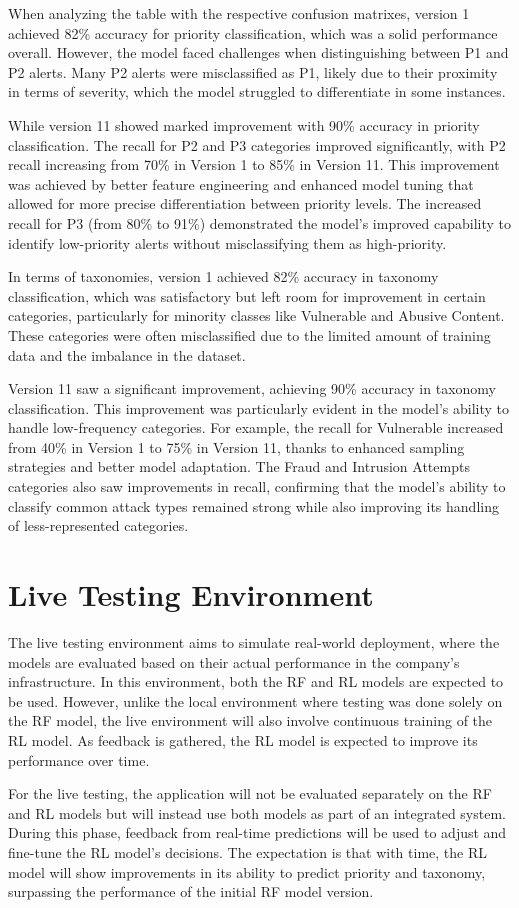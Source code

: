 When analyzing the table with the respective confusion matrixes, version 1 achieved 82\% accuracy for priority classification, which was a solid performance overall. 
However, the model faced challenges when distinguishing between P1 and P2 alerts. 
Many P2 alerts were misclassified as P1, likely due to their proximity in terms of severity, which the model struggled to differentiate in some instances.

While version 11 showed marked improvement with 90\% accuracy in priority classification. 
The recall for P2 and P3 categories improved significantly, with P2 recall increasing from 70\% in Version 1 to 85\% in Version 11. 
This improvement was achieved by better feature engineering and enhanced model tuning that allowed for more precise differentiation between priority levels. 
The increased recall for P3 (from 80\% to 91\%) demonstrated the model's improved capability to identify low-priority alerts without misclassifying them as high-priority.

In terms of taxonomies, version 1 achieved 82\% accuracy in taxonomy classification, which was satisfactory but left room for improvement in certain categories, particularly for minority classes like Vulnerable and Abusive Content. 
These categories were often misclassified due to the limited amount of training data and the imbalance in the dataset.

Version 11 saw a significant improvement, achieving 90\% accuracy in taxonomy classification. 
This improvement was particularly evident in the model's ability to handle low-frequency categories. For example, the recall for Vulnerable increased from 40\% in Version 1 to 75\% in Version 11, thanks to enhanced sampling strategies and better model adaptation. 
The Fraud and Intrusion Attempts categories also saw improvements in recall, confirming that the model's ability to classify common attack types remained strong while also improving its handling of less-represented categories.

\section{Live Testing Environment}

The live testing environment aims to simulate real-world deployment, where the models are evaluated based on their actual performance in the company's infrastructure. 
In this environment, both the RF and RL models are expected to be used. 
However, unlike the local environment where testing was done solely on the RF model, the live environment will also involve continuous training of the RL model. 
As feedback is gathered, the RL model is expected to improve its performance over time.

For the live testing, the application will not be evaluated separately on the RF and RL models but will instead use both models as part of an integrated system. 
During this phase, feedback from real-time predictions will be used to adjust and fine-tune the RL model's decisions. 
The expectation is that with time, the RL model will show improvements in its ability to predict priority and taxonomy, surpassing the performance of the initial RF model version.
